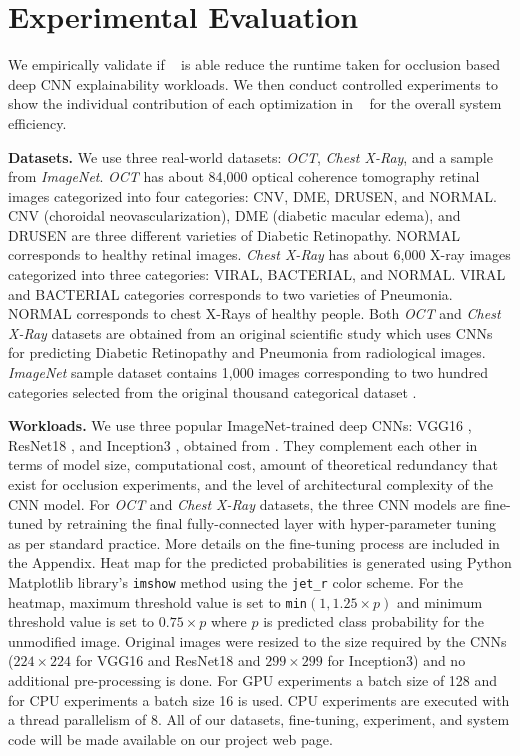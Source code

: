 \section{Experimental Evaluation}
We empirically validate if \system~ is able reduce the runtime taken for occlusion based deep CNN explainability workloads.
We then conduct controlled experiments to show the individual contribution of each optimization in \system~ for the overall system efficiency.

\vspace{2mm}
\noindent \textbf{Datasets.}
We use three real-world datasets: \textit{OCT}, \textit{Chest X-Ray}, and a sample from \textit{ImageNet}. \textit{OCT} has about 84,000 optical coherence tomography retinal images categorized into four categories: CNV, DME, DRUSEN, and NORMAL. CNV (choroidal neovascularization), DME (diabetic macular edema), and DRUSEN are three different varieties of Diabetic Retinopathy. NORMAL corresponds to healthy retinal images. \textit{Chest X-Ray} has about 6,000 X-ray images categorized into three categories: VIRAL, BACTERIAL, and NORMAL.
VIRAL and BACTERIAL categories corresponds to two varieties of Pneumonia. NORMAL corresponds to chest X-Rays of healthy people. Both \textit{OCT} and \textit{Chest X-Ray} datasets are obtained from an original scientific study \cite{kermany2018identifying} which uses CNNs for predicting Diabetic Retinopathy and Pneumonia from radiological images. \textit{ImageNet} sample dataset contains 1,000 images corresponding to two hundred categories selected from the original thousand categorical dataset \cite{deng2009imagenet}.

\vspace{2mm}
\noindent \textbf{Workloads.}
We use three popular ImageNet-trained deep CNNs: VGG16 \cite{vggnet}, ResNet18 \cite{resnet}, and Inception3 \cite{inception}, obtained from \cite{torchvisionmodels}. They complement each other in terms of model size, computational cost, amount of theoretical redundancy that exist for occlusion experiments, and the level of architectural complexity of the CNN model. For \textit{OCT} and \textit{Chest X-Ray} datasets, the three CNN models are fine-tuned by retraining the final fully-connected layer with hyper-parameter tuning as per standard practice. More details on the fine-tuning process are included in the Appendix. Heat map for the predicted probabilities is generated using Python Matplotlib library's \texttt{imshow} method using the \texttt{jet\_r} color scheme. For the heatmap, maximum threshold value is set to \texttt{min}$(1, 1.25 \times p)$ and minimum threshold value is set to $0.75 \times p$ where $p$ is predicted class probability for the unmodified image. Original images were resized to the size required by the CNNs ($224\times224$ for VGG16 and ResNet18 and $299\times299$ for Inception3) and no additional pre-processing is done. For GPU experiments a batch size of 128 and for CPU experiments a batch size 16 is used. CPU experiments are executed with a thread parallelism of 8.
All of our datasets, fine-tuning, experiment, and system code will be made available on our project web page.

